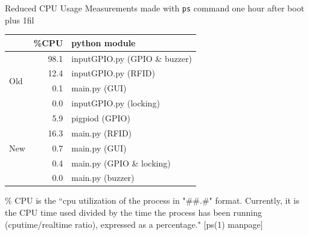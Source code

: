 \documentclass[t]{beamer}
\begin{document}
\begin{frame}{Reduced CPU Usage}
    Measurements made with \texttt{ps} command one hour after boot \newline{}
    \vspace*{1em}
    \vskip0pt plus 1fil
    \begin{tabular}{lrl}
        \hline
         & \%CPU & python module                 \\
        \hline
        \multirow{4}{*}{Old}
         & 98.1  & inputGPIO.py (GPIO \& buzzer) \\
         & 12.4  & inputGPIO.py (RFID)           \\
         & 0.1   & main.py (GUI)                 \\
         & 0.0   & inputGPIO.py (locking)        \\
        \hline \hline
        \multirow{5}{*}{New}
         & 5.9   & pigpiod (GPIO)                \\
         & 16.3  & main.py (RFID)                \\
         & 0.7   & main.py (GUI)                 \\
         & 0.4   & main.py (GPIO \& locking)     \\
         & 0.0   & main.py (buzzer)              \\
        \hline
    \end{tabular}

    \scriptsize \% CPU is the ``cpu utilization of the process in "\#\#.\#" format.
    Currently, it is the CPU time used divided by the time the process has been running (cputime/realtime ratio),
    expressed as a percentage." [ps(1) manpage]
\end{frame}
\end{document}
